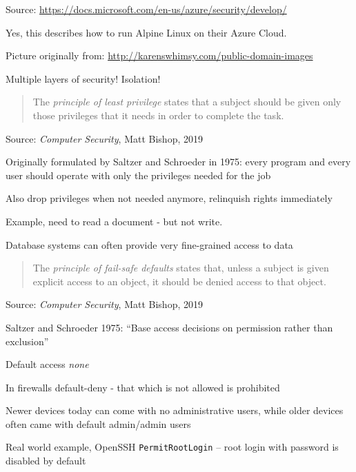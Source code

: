 \documentclass[Screen16to9,17pt]{foils}
\begin{document}
Source:
\url{https://docs.microsoft.com/en-us/azure/security/develop/}

Yes, this describes how to run Alpine Linux on their Azure Cloud.



\centerline{Picture originally from: \url{http://karenswhimsy.com/public-domain-images}}





\centerline{\hlkbig\color{security6blue} Multiple layers of security! Isolation!}




\begin{quote}
The \emph{principle of least privilege} states that a subject should be given only those privileges that it needs in order to complete the task.
\end{quote}
Source: \emph{Computer Security}, Matt Bishop, 2019

\begin{list2}
\item Originally formulated by Saltzer and Schroeder in 1975: every program and every user should operate with only the privileges needed for the job
\item Also drop privileges when not needed anymore, relinquish rights immediately
\item Example, need to read a document - but not write.
\item Database systems can often provide very fine-grained access to data
\end{list2}


\begin{quote}
The \emph{principle of fail-safe defaults} states that, unless a subject is given explicit access to an object, it should be denied access to that object.
\end{quote}
Source: \emph{Computer Security}, Matt Bishop, 2019

\begin{list2}
\item Saltzer and Schroeder 1975: ``Base access decisions on permission rather than exclusion''
\item Default access \emph{none}
\item In firewalls default-deny - that which is not allowed is prohibited
\item Newer devices today can come with no administrative users, while older devices often came with default admin/admin users
\item Real world example, OpenSSH \verb+PermitRootLogin+ -- root login with password is disabled by default
\end{list2}
\end{document}
